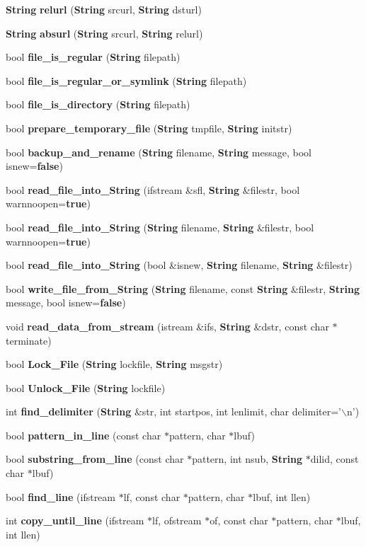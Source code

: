 \begin{CompactItemize}
\item 
{\bf String} {\bf relurl} ({\bf String} srcurl, {\bf String} dsturl)
\item 
{\bf String} {\bf absurl} ({\bf String} srcurl, {\bf String} relurl)
\item 
bool {\bf file\_\-is\_\-regular} ({\bf String} filepath)
\item 
bool {\bf file\_\-is\_\-regular\_\-or\_\-symlink} ({\bf String} filepath)
\item 
bool {\bf file\_\-is\_\-directory} ({\bf String} filepath)
\item 
bool {\bf prepare\_\-temporary\_\-file} ({\bf String} tmpfile, {\bf String} initstr)
\item 
bool {\bf backup\_\-and\_\-rename} ({\bf String} filename, {\bf String} message, bool isnew={\bf false})
\item 
bool {\bf read\_\-file\_\-into\_\-String} (ifstream \&sfl, {\bf String} \&filestr, bool warnnoopen={\bf true})
\item 
bool {\bf read\_\-file\_\-into\_\-String} ({\bf String} filename, {\bf String} \&filestr, bool warnnoopen={\bf true})
\item 
bool {\bf read\_\-file\_\-into\_\-String} (bool \&isnew, {\bf String} filename, {\bf String} \&filestr)
\item 
bool {\bf write\_\-file\_\-from\_\-String} ({\bf String} filename, const {\bf String} \&filestr, {\bf String} message, bool isnew={\bf false})
\item 
void {\bf read\_\-data\_\-from\_\-stream} (istream \&ifs, {\bf String} \&dstr, const char $\ast$terminate)
\item 
bool {\bf Lock\_\-File} ({\bf String} lockfile, {\bf String} msgstr)
\item 
bool {\bf Unlock\_\-File} ({\bf String} lockfile)
\item 
int {\bf find\_\-delimiter} ({\bf String} \&str, int startpos, int lenlimit, char delimiter='$\backslash$n')
\item 
bool {\bf pattern\_\-in\_\-line} (const char $\ast$pattern, char $\ast$lbuf)
\item 
bool {\bf substring\_\-from\_\-line} (const char $\ast$pattern, int nsub, {\bf String} $\ast$dilid, const char $\ast$lbuf)
\item 
bool {\bf find\_\-line} (ifstream $\ast$lf, const char $\ast$pattern, char $\ast$lbuf, int llen)
\item 
int {\bf copy\_\-until\_\-line} (ifstream $\ast$lf, ofstream $\ast$of, const char $\ast$pattern, char $\ast$lbuf, int llen)

\end{CompactItemize}
